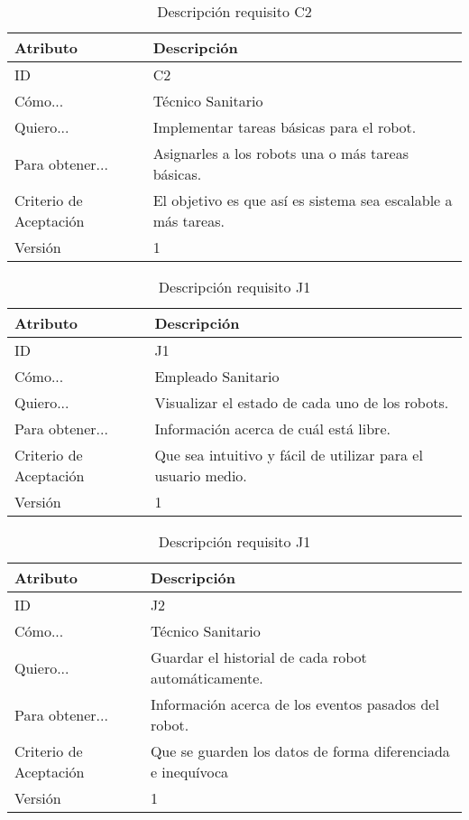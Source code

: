 \begin{table}[H]
    \label{tab:reqC2}
 	\caption{Descripción requisito C2}
	\centering
	
	\begin{tabular}{C{3cm}|C{12cm}}
 		\toprule
 		\textbf{Atributo} & \textbf{Descripción} \\
 		\midrule
 	    ID & C2 \\
 	    Cómo... & Técnico Sanitario \\
 	    Quiero... & Implementar tareas básicas para el robot. \\
 	    Para obtener... & Asignarles a los robots una o más tareas básicas.  \\
 	    Criterio de Aceptación & El objetivo es que así es sistema sea escalable a más tareas. \\
 	    Versión & 1 \\
 		\bottomrule
 		\end{tabular}
\end{table}

\begin{table}[H]
    \label{tab:reqJ1}
 	\caption{Descripción requisito J1}
	\centering
	
	\begin{tabular}{C{3cm}|C{12cm}}
 		\toprule
 		\textbf{Atributo} & \textbf{Descripción} \\
 		\midrule
 	    ID & J1 \\
 	    Cómo... & Empleado Sanitario \\
 	    Quiero... & Visualizar el estado de cada uno de los robots. \\
 	    Para obtener... & Información acerca de cuál está libre.  \\
 	    Criterio de Aceptación & Que sea intuitivo y fácil de utilizar para el usuario medio. \\
 	    Versión & 1 \\
 		\bottomrule
 		\end{tabular}
\end{table}


\begin{table}[H]
    \label{tab:reqJ1}
 	\caption{Descripción requisito J1}
	\centering
	
	\begin{tabular}{C{3cm}|C{12cm}}
 		\toprule
 		\textbf{Atributo} & \textbf{Descripción} \\
 		\midrule
 	    ID & J2 \\
 	    Cómo... & Técnico Sanitario \\
 	    Quiero... & Guardar el historial de cada robot automáticamente. \\
 	    Para obtener... & Información acerca de los eventos pasados del robot.  \\
 	    Criterio de Aceptación & Que se guarden los datos de forma diferenciada e inequívoca  \\
 	    Versión & 1 \\
 		\bottomrule
 		\end{tabular}
\end{table}

